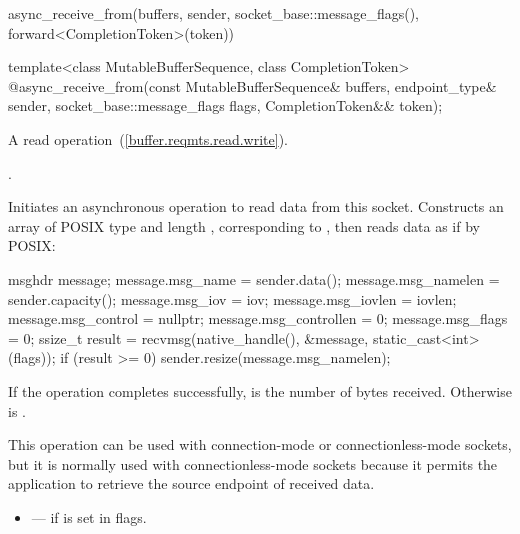 \begin{itemdescr}
\pnum
\returns
\begin{codeblock}
async_receive_from(buffers, sender, socket_base::message_flags(),
                   forward<CompletionToken>(token))
\end{codeblock}
\end{itemdescr}

\begin{itemdecl}
template<class MutableBufferSequence, class CompletionToken>
  @\DEDUCED@ async_receive_from(const MutableBufferSequence& buffers,
                             endpoint_type& sender,
                             socket_base::message_flags flags,
                             CompletionToken&& token);
\end{itemdecl}

\begin{itemdescr}
\pnum
A read operation~(\ref{buffer.reqmts.read.write}).

\pnum
\completionsig {}.

\pnum
\effects Initiates an asynchronous operation to read data from this socket. Constructs an array  of POSIX type  and length , corresponding to , then reads data as if by POSIX:
\begin{codeblock}
msghdr message;
message.msg_name = sender.data();
message.msg_namelen = sender.capacity();
message.msg_iov = iov;
message.msg_iovlen = iovlen;
message.msg_control = nullptr;
message.msg_controllen = 0;
message.msg_flags = 0;
ssize_t result = recvmsg(native_handle(), &message, static_cast<int>(flags));
if (result >= 0)
  sender.resize(message.msg_namelen);
\end{codeblock}


\pnum
If the operation completes successfully,  is the number of bytes received. Otherwise  is .

\pnum
 \begin{note} This operation can be used with connection-mode or connectionless-mode sockets, but it is normally used with connectionless-mode sockets because it permits the application to retrieve the source endpoint of received data. \end{note}

\pnum
\errors
\begin{itemize}
\item
{} --- if  is set in flags.
\end{itemize}
\end{itemdescr}

